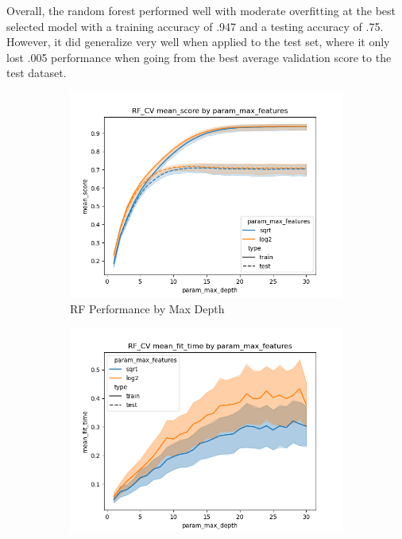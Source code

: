\documentclass[12pt]{article}
\begin{document}
Overall, the random forest performed well with moderate overfitting at the best selected model with a training accuracy 
of .947 and a testing accuracy of .75. However, it did generalize very well when applied to the test set, where it only 
lost .005 performance when going from the best average validation score to the test dataset.
\begin{figure}
  \begin{subfigure}{.5\textwidth}
    \includegraphics[width=.95\textwidth]{../results/rf_cv/param_max_features_mean_score_param_max_depth.png}
    \caption{RF Performance by Max Depth}
    \end{subfigure}%
  \begin{subfigure}{.5\textwidth}
    \includegraphics[width=.95\textwidth]{../results/rf_cv/param_max_features_mean_fit_time_param_max_depth.png}

\end{subfigure}
\end{figure}
\end{document}
